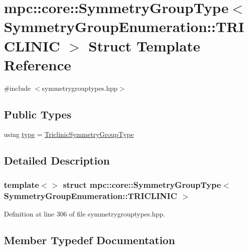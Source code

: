 \hypertarget{structmpc_1_1core_1_1_symmetry_group_type_3_01_symmetry_group_enumeration_1_1_t_r_i_c_l_i_n_i_c_01_4}{}\section{mpc\+:\+:core\+:\+:Symmetry\+Group\+Type$<$ Symmetry\+Group\+Enumeration\+:\+:T\+R\+I\+C\+L\+I\+N\+IC $>$ Struct Template Reference}
\label{structmpc_1_1core_1_1_symmetry_group_type_3_01_symmetry_group_enumeration_1_1_t_r_i_c_l_i_n_i_c_01_4}


{\ttfamily \#include $<$symmetrygrouptypes.\+hpp$>$}

\subsection*{Public Types}
\begin{DoxyCompactItemize}
\item 
using \mbox{\hyperlink{structmpc_1_1core_1_1_symmetry_group_type_3_01_symmetry_group_enumeration_1_1_t_r_i_c_l_i_n_i_c_01_4_a952cb9fbd79d703e60ec18fb7f82f806}{type}} = \mbox{\hyperlink{structmpc_1_1core_1_1_triclinic_symmetry_group_type}{Triclinic\+Symmetry\+Group\+Type}}
\end{DoxyCompactItemize}


\subsection{Detailed Description}
\subsubsection*{template$<$$>$\newline
struct mpc\+::core\+::\+Symmetry\+Group\+Type$<$ Symmetry\+Group\+Enumeration\+::\+T\+R\+I\+C\+L\+I\+N\+I\+C $>$}



Definition at line 306 of file symmetrygrouptypes.\+hpp.



\subsection{Member Typedef Documentation}
\mbox{\label{structmpc_1_1core_1_1_symmetry_group_type_3_01_symmetry_group_enumeration_1_1_t_r_i_c_l_i_n_i_c_01_4_a952cb9fbd79d703e60ec18fb7f82f806}} 
